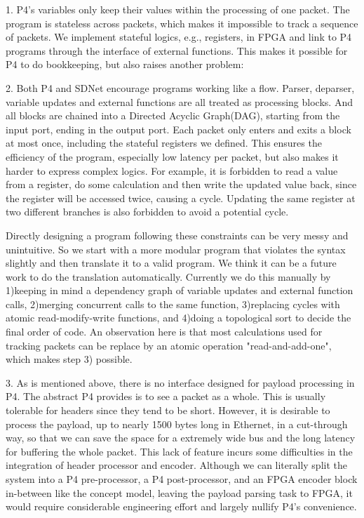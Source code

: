 1. P4's variables only keep their values within the processing of one packet.
The program is stateless across packets, which makes it impossible to track
a sequence of packets. We implement stateful logics, e.g., registers, in
FPGA and link to P4 programs through the interface of external functions.
This makes it possible for P4 to do bookkeeping, but also raises another problem:

2. Both P4 and SDNet encourage programs working like a flow. Parser, deparser,
variable updates and external functions are all treated as processing blocks. 
And all blocks are chained into a Directed Acyclic Graph(DAG), starting 
from the input port, ending in the output port. Each packet only enters
and exits a block at most once, including the stateful registers we defined.
This ensures the efficiency of the program, especially low latency per packet, 
but also makes it harder to express complex logics. For example, it is forbidden
to read a value from a register, do some calculation and then write the updated 
value back, since the register will be accessed twice, causing a cycle.
Updating the same register at two different branches is also forbidden to
avoid a potential cycle.

Directly designing a program following these constraints can be very messy
and unintuitive. So we start with a more modular program that violates the
syntax slightly and then translate it to a valid program. We think it can be 
a future work to do the translation automatically. Currently we do this manually
by 1)keeping in mind a dependency graph of variable updates and external function 
calls, 2)merging concurrent calls to the same function, 3)replacing cycles with
atomic read-modify-write functions, and 4)doing a topological sort to decide 
the final order of code. An observation here is that most calculations used
for tracking packets can be replace by an atomic operation "read-and-add-one",
which makes step 3) possible.

3. As is mentioned above, there is no interface designed for payload processing
in P4. The abstract P4 provides is to see a packet as a whole. This is usually 
tolerable for headers since they tend to be short. However, it is desirable to process
the payload, up to nearly 1500 bytes long in Ethernet, in a cut-through way, so that we can 
save the space for a extremely wide bus and the long latency for buffering the 
whole packet. This lack of feature incurs some difficulties in the integration of header processor and encoder.
Although we can literally split the system into a P4 pre-processor, a P4 post-processor, 
and an FPGA encoder block in-between like the concept model, leaving the payload parsing task to FPGA,
it would require considerable engineering effort and largely nullify P4's convenience.

